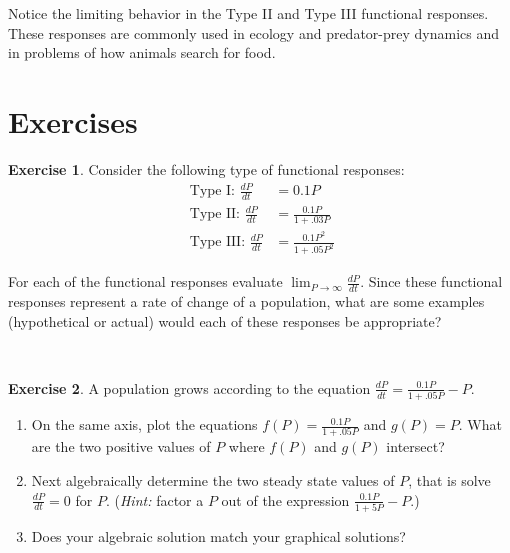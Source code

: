 \documentclass[
]{book}
\theoremstyle{definition}
\theoremstyle{definition}
\theoremstyle{definition}
\newtheorem{exercise}{Exercise}[chapter]
\theoremstyle{remark}
\begin{document}
Notice the limiting behavior in the Type II and Type III functional responses. These responses are commonly used in ecology and predator-prey dynamics and in problems of how animals search for food.

\newpage

\hypertarget{exercises-2}{%
\section{Exercises}\label{exercises-2}}

\begin{exercise}
\protect\hypertarget{exr:unnamed-chunk-54}{}{\label{exr:unnamed-chunk-54} }Consider the following type of functional responses:
\begin{align}
\mbox{ Type I: } \frac{dP}{dt} &= 0.1 P \\
\mbox{ Type II: } \frac{dP}{dt} &= \frac{0.1P}{1+.03P} \\
\mbox{ Type III: } \frac{dP}{dt} &= \frac{0.1P^{2}}{1+.05P^{2}}
\end{align}

For each of the functional responses evaluate \(\displaystyle \lim_{P \rightarrow \infty} \frac{dP}{dt}\). Since these functional responses represent a rate of change of a population, what are some examples (hypothetical or actual) would each of these responses be appropriate?
\end{exercise}

~
\begin{exercise}
\protect\hypertarget{exr:unnamed-chunk-55}{}{\label{exr:unnamed-chunk-55} }A population grows according to the equation \(\displaystyle \frac{dP}{dt} = \frac{0.1P}{1+.05P} -P\).

\begin{enumerate}[label=\alph*.]
\item On the same axis, plot the equations $\displaystyle f(P) = \frac{0.1P}{1+.05P}$ and $g(P)=P$.  What are the two positive values of $P$ where $f(P)$ and $g(P)$ intersect?
\item Next algebraically determine the two steady state values of $P$, that is solve $\displaystyle \frac{dP}{dt}=0$ for $P$.  (\emph{Hint:} factor a $P$ out of the expression $\displaystyle \frac{0.1P}{1+5P} -P$.)
\item Does your algebraic solution match your graphical solutions?
\end{enumerate}
\end{exercise}

~
\end{document}
